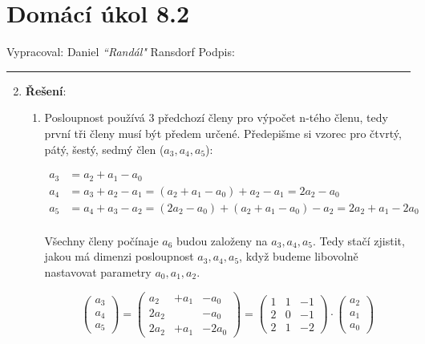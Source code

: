 \documentclass[12pt]{article}
\begin{document}
\section*{Domácí úkol 8.2}

Vypracoval: Daniel \textit{``Randál"} Ransdorf \hfill Podpis: \rule{4cm}{0.4pt}

\begin{enumerate}
  
  \setcounter{enumi}{1}

  \item \textbf{Řešení}:
  
  \begin{enumerate}
    \item Posloupnost používá 3 předchozí členy pro výpočet n-tého členu,
      tedy první tři členy musí být předem určené. Předepišme si vzorec pro
      čtvrtý, pátý, šestý, sedmý člen ($a_3, a_4, a_5$):

      \begin{align*}
        a_3 &= a_2 + a_1 - a_0 \\
        a_4 &= a_3 + a_2 - a_1 = (a_2 + a_1 - a_0) + a_2 - a_1 = 2a_2 - a_0 \\
        a_5 &= a_4 + a_3 - a_2 = (2a_2 - a_0) + (a_2 + a_1 - a_0) - a_2 = 2a_2 + a_1 - 2a_0 \\
      \end{align*}

      Všechny členy počínaje $a_6$ budou založeny na $a_3, a_4, a_5$.
      Tedy stačí zjistit, jakou má dimenzi posloupnost $a_3, a_4, a_5$,
      když budeme libovolně nastavovat parametry $a_0, a_1, a_2$.

      \[
        \left(\begin{array}{c}
          a_3 \\ a_4 \\ a_5
        \end{array}\right) = \left(\begin{array}{ccc}
          a_2 & +a_1 & -a_0 \\
          2a_2 && -a_0 \\
          2a_2 & +a_1 & -2a_0
        \end{array}\right) = \left(\begin{array}{ccc}
          1&1&-1\\2&0&-1\\2&1&-2
        \end{array}\right) \cdot \left(\begin{array}{c}
          a_2 \\ a_1 \\ a_0
        \end{array}\right)
      \]


\end{enumerate}
\end{enumerate}
\end{document}
